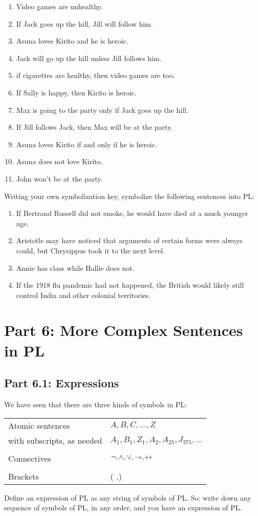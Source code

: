 \begin{enumerate}
\item Video games are unhealthy.
\item If Jack goes up the hill, Jill will follow him.
\item Asuna loves Kirito and he is heroic. 
\item Jack will go up the hill unless Jill follows him.
\item if cigarettes are healthy, then video games are too. 
\item If Sally is happy, then Kirito is heroic. 
\item Max is going to the party only if Jack goes up the hill.
\item If Jill follows Jack, then Max will be at the party.
\item Asuna loves Kirito if and only if he is heroic.
\item Asuna does not love Kirito.
\item John won't be at the party. 
\end{enumerate}
\problempart
Writing your own symbolization key, symbolize the following sentences into PL:
\begin{enumerate}
\item If Bertrand Russell did not smoke, he would have died at a much younger age.
\item Aristotle may have noticed that arguments of certain forms were always could, but Chrysippus took it to the next level.
\item Annie has class while Hallie does not.
\item If the 1918 flu pandemic had not happened, the British would likely still control India and other colonial territories. 
\end{enumerate}

\chapter{Part 6: More Complex Sentences in PL}
\section{Part 6.1: Expressions}
\label{s:Part 6.1: Expressions}
We have seen that there are three kinds of symbols in PL:
\begin{center}
\begin{tabular}{l l}
Atomic sentences & $A,B,C,\ldots,Z$\\
with subscripts, as needed & $A_1, B_1,Z_1,A_2,A_{25},J_{375},\ldots$\\
\\
Connectives & $\neg,\wedge,\vee,\rightarrow,\leftrightarrow$\\
\\
Brackets &( ,)\\
\end{tabular}
\end{center}
Define an expression of PL as any string of symbols of PL. So: write down any sequence of symbols of PL, in any order, and you have an expression of PL.
